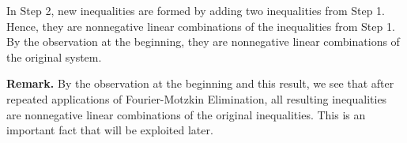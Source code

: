 \begin{enumerate}
  In Step 2, new inequalities are formed by adding two inequalities from
  Step 1. Hence, they are nonnegative linear combinations of the
  inequalities from Step 1. By the observation at the beginning, they
  are nonnegative linear combinations of the original system.

  \textbf{Remark.} By the observation at the beginning and this result,
  we see that after repeated applications of Fourier-Motzkin
  Elimination, all resulting inequalities are nonnegative linear
  combinations of the original inequalities. This is an important fact
  that will be exploited later.
\end{enumerate}
